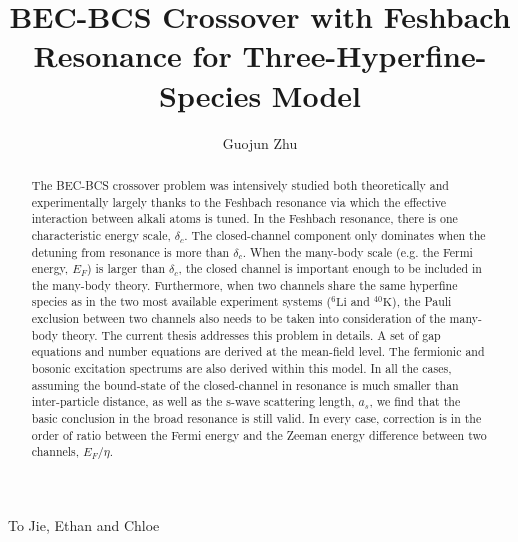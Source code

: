 \documentclass[edeposit,fullpage,prequest]{uiucthesis2009}
\begin{document}
\title{BEC-BCS Crossover with Feshbach Resonance for Three-Hyperfine-Species Model}
\author{Guojun Zhu}
\phdthesis
{}
\maketitle

\frontmatter

%
\begin{abstract}
The BEC-BCS crossover problem was intensively studied both theoretically and experimentally largely thanks to the Feshbach resonance via which the effective interaction between alkali atoms is tuned.  In the Feshbach resonance, there is one characteristic energy scale, $\delta_c$. The closed-channel component only dominates when the detuning from resonance is more than $\delta_c$.  When the many-body scale (e.g. the Fermi energy, $E_{F}$) is larger than $\delta_c$, the closed channel is important enough to be included in the many-body theory.  Furthermore, when two channels share the same hyperfine species as in the two most available experiment systems (${}^6\text{Li}$ and ${}^{40}\text{K}$), the Pauli exclusion between two channels also needs to be taken into consideration of the many-body theory.  The current  thesis addresses this problem in details. A set of gap equations and number equations  are derived at the mean-field level.  The fermionic and bosonic excitation spectrums are also derived within this model.  In all the cases, assuming the bound-state of the closed-channel in resonance is much smaller than inter-particle distance, as well as the s-wave scattering length, $a_s$, we find that  the basic conclusion in the broad resonance is still valid. In every case, correction is  in the  order of ratio between the Fermi energy and the Zeeman energy difference between two channels, $E_F/\eta$.  
\end{abstract}

\begin{dedication}
To Jie, Ethan and Chloe
\end{dedication}
\end{document}
